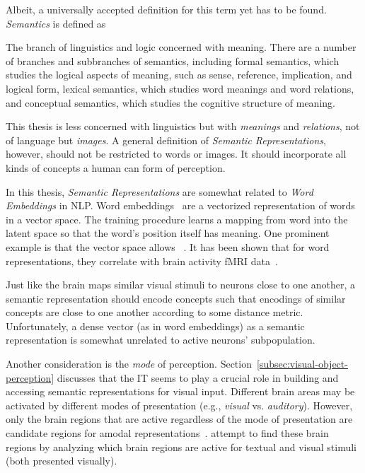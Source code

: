 Albeit, a universally accepted definition for this term yet has to be found.
\textit{Semantics} is defined as~\citep{lexico}
\begin{displayquote}
    The branch of linguistics and logic concerned with meaning. There are a number of branches and subbranches of semantics, including formal semantics, which studies the logical aspects of meaning, such as sense, reference, implication, and logical form, lexical semantics, which studies word meanings and word relations, and conceptual semantics, which studies the cognitive structure of meaning.
\end{displayquote}
This thesis is less concerned with linguistics but with \textit{meanings} and \textit{relations}, not of language but \textit{images}.
A general definition of \textit{Semantic Representations}, however, should not be restricted to words or images.
It should incorporate all kinds of concepts a human can form of perception.

In this thesis, \textit{Semantic Representations} are somewhat related to \textit{Word Embeddings} in \ac{NLP}.
Word embeddings~\citep{mikolov2013efficient} are a vectorized representation of words in a vector space.
The training procedure learns a mapping from word into the latent space so that the word's position itself has meaning.
One prominent example is that the vector space allows ~\citep{mikolov2013efficient}.
It has been shown that for word representations, they correlate with brain activity fMRI data~\citep{ruan2016exploring, anderson2013words}.

Just like the brain maps similar visual stimuli to neurons close to one another, a semantic representation should encode concepts such that encodings of similar concepts are close to one another according to some distance metric.
Unfortunately, a dense vector (as in word embeddings) as a semantic representation is somewhat unrelated to active neurons’ subpopulation.

Another consideration is the \textit{mode} of perception.
Section~\ref{subsec:visual-object-perception} discusses that the \ac{IT} seems to play a crucial role in building and accessing semantic representations for visual input.
Different brain areas may be activated by different modes of presentation (e.g., \textit{visual} vs. \textit{auditory}).
However, only the brain regions that are active regardless of the mode of presentation are candidate regions for amodal representations~\citep{fairhall2013brain}.
\citet{fairhall2013brain} attempt to find these brain regions by analyzing which brain regions are active for textual and visual stimuli (both presented visually).

